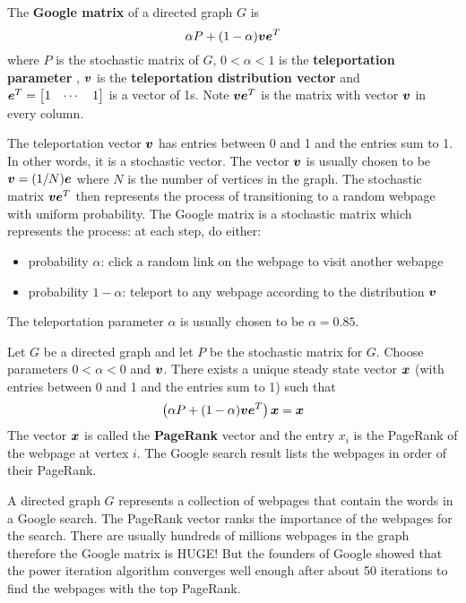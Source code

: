\begin{definition}
The {\bf Google matrix} of a directed graph $G$ is
$$
\alpha P + (1 - \alpha) \boldsymbol{v} \boldsymbol{e}^T
$$
where $P$ is the stochastic matrix of $G$, $0 < \alpha < 1$ is the {\bf teleportation parameter} \cite[p.322]{DG}, $\boldsymbol{v}$ is the {\bf teleportation distribution vector} and $\boldsymbol{e}^T = \begin{bmatrix} 1 & \cdots & 1 \end{bmatrix}$ is a vector of 1s. Note $\boldsymbol{v} \boldsymbol{e}^T$ is the matrix with vector $\boldsymbol{v}$ in every column.
\end{definition}

\begin{note}
The teleportation vector $\boldsymbol{v}$ has entries between 0 and 1 and the entries sum to 1. In other words, it is a stochastic vector. The vector $\boldsymbol{v}$ is usually chosen to be $\boldsymbol{v} = (1/N)\boldsymbol{e}$ where $N$ is the number of vertices in the graph. The stochastic matrix $\boldsymbol{v} \boldsymbol{e}^T$ then represents the process of transitioning to a random webpage with uniform probability. The Google matrix is a stochastic matrix which represents the process: at each step, do either:
\begin{itemize}
\item probability $\alpha$: click a random link on the webpage to visit another webapge
\item probability $1 - \alpha$: teleport to any webpage according to the distribution $\boldsymbol{v}$
\end{itemize}
The teleportation parameter $\alpha$ is usually chosen to be $\alpha = 0.85$.
\end{note}

\begin{proposition}
Let $G$ be a directed graph and let $P$ be the stochastic matrix for $G$. Choose parameters $0 < \alpha < 0$ and $\boldsymbol{v}$. There exists a unique steady state vector $\boldsymbol{x}$ (with entries between 0 and 1 and the entries sum to 1) such that
$$
\left( \alpha P + (1 - \alpha) \boldsymbol{v} \boldsymbol{e}^T \right) \boldsymbol{x} = \boldsymbol{x}
$$
The vector $\boldsymbol{x}$ is called the {\bf PageRank} vector and the entry $x_i$ is the PageRank of the webpage at vertex $i$. The Google search result lists the webpages in order of their PageRank.
\end{proposition}

\begin{note}
A directed graph $G$ represents a collection of webpages that contain the words in a Google search. The PageRank vector ranks the importance of the webpages for the search. There are usually hundreds of millions webpages in the graph therefore the Google matrix is HUGE! But the founders of Google showed that the power iteration algorithm converges well enough after about 50 iterations to find the webpages with the top PageRank.
\end{note}

